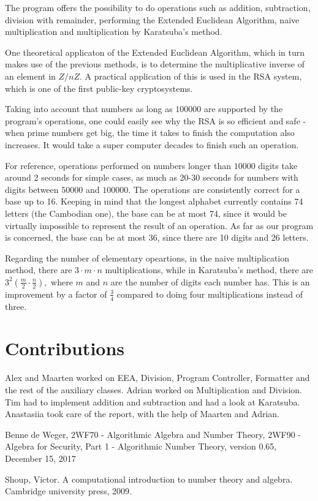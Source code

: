 \documentclass[a4paper]{article}
\begin{document}
The program offers the possibility to do operations such as addition, subtraction, division with remainder, performing the Extended Euclidean Algorithm, naive multiplication and multiplication by Karatsuba's method. 

One theoretical applicaton of the Extended Euclidean Algorithm, which in turn makes use of the previous methods, is to determine the multiplicative inverse of an element in $Z/nZ.$ A practical application of this is used in the RSA system, which is one of the first public-key cryptosystems. 

Taking into account that numbers as long as $100 000$ are supported by the program's operations, one could easily see why the RSA is so efficient and safe - when prime numbers get big, the time it takes to finish the computation also increases. It would take a super computer decades to finish such an operation. 

For reference, operations performed on numbers longer than $10 000$ digits take around 2 seconds for simple cases, as much as 20-30 seconds for numbers with digits between $50 000$ and $100 000$. The operations are consistently correct for a base up to 16. Keeping in mind that the longest alphabet currently contains 74 letters (the Cambodian one), the base can be at most 74, since it would be virtually impossible to represent the result of an operation. As far as our program is concerned, the base can be at most 36, since there are 10 digits and 26 letters. 

Regarding the number of elementary opeartions, in the naive multiplication method, there are $ 3 \cdot m \cdot n$ multiplications, while in Karatsuba's method, there are $ 3^{2} (\frac{m}{2} \cdot \frac{n}{2}), $ where $m$ and $n$ are the number of digits each number has. This is an improvement by a factor of $\frac{3}{4}$ compared to doing four multiplications instead of three.


\section{Contributions}

Alex and Maarten worked on EEA, Division, Program Controller, Formatter and the rest of the auxiliary classes.
Adrian worked on Multiplication and Division.
Tim had to implement addition and subtraction and had a look at Karatsuba.
Anastasiia took care of the report, with the help of Maarten and Adrian.  

\begin{thebibliography}{9}

  Benne de Weger,
  2WF70 - Algorithmic Algebra and Number Theory,
  2WF90 - Algebra for Security,
  Part 1 - Algorithmic Number Theory,
  version 0.65,
  December 15, 2017

Shoup, Victor. A computational introduction to number theory and algebra. Cambridge university press, 2009.


\end{thebibliography}
\end{document}
